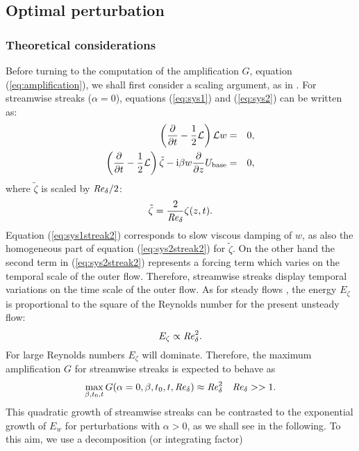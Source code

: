 \documentclass{jfm}
\newcommand\be{\begin{equation}}
\newcommand\ee{\end{equation}}
\newcommand\bea{\begin{eqnarray}}
\newcommand\eea{\end{eqnarray}}
\newcommand\base{{\rm base}}
\newcommand\Rey{\mbox{\textit{Re}}}  %
\newcommand\dz{ \frac{\partial}{\partial z}}
\begin{document}
\subsection{Optimal perturbation}

\subsubsection{Theoretical considerations}

Before turning to the computation of the amplification $ G $,
equation (\ref{eq:amplification}), we shall first consider
a scaling argument, as in \citet{Gustavsson1991,SchmidHenningson2001}. 
For streamwise streaks ($ \alpha = 0 $), equations (\ref{eq:sys1})
and (\ref{eq:sys2}) 
can be written as:
\bea
\left( \frac{\partial}{\partial t}  - \frac{1}{2} \mathcal{L}
\right) \mathcal{L} {w}
 &=& 0, \label{eq:sys1streak2} \\
\left( \frac{\partial}{\partial t} - \frac{1}{2} \mathcal{L}
\right) \tilde{\zeta} - {\rm i} \beta {w} \dz U_\base 
&=& 0, \label{eq:sys2streak2}
\eea
where 
$ \tilde{\zeta} $ is scaled by $ \Rey_\delta /2$:
\be
\tilde{\zeta} = \frac{2}{\Rey_\delta} \zeta(z,t) .
\ee
Equation (\ref{eq:sys1streak2}) corresponds to slow
viscous damping of $ w $, as also the homogeneous part of
equation (\ref{eq:sys2streak2}) for $ \tilde{\zeta} $. On the
other hand the second term in (\ref{eq:sys2streak2}) represents
a forcing term which varies on the temporal scale of
the outer flow. Therefore, streamwise streaks display
temporal variations on the time scale of the outer flow.
As for steady flows \citep{Gustavsson1991,SchmidHenningson2001},
the energy $ E_\zeta $ is proportional to the square of the
Reynolds number for the present unsteady flow:
\be
E_\zeta \propto \Rey_\delta^2. 
\ee
For
large Reynolds numbers $ E_\zeta $ will dominate. Therefore,
the maximum amplification $ G $ for streamwise streaks is expected to
behave as 
\be
\max_{\beta,t_0,t} G(\alpha=0,\beta,t_0,t,\Rey_\delta) \approx \Rey^2_\delta \quad \Rey_\delta >> 1. \label{eq:streakGrowth}
\ee
This quadratic growth of streamwise streaks can be contrasted to the
exponential growth of $ E_w $ for perturbations with $ \alpha > 0 $, as we shall see in the following. To
this aim, we use a decomposition (or integrating factor)
\end{document}
